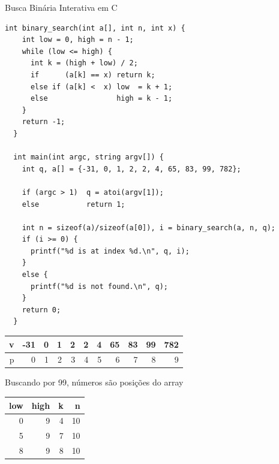\documentclass{beamer}
\begin{document}
\begin{frame}{Busca Binária Interativa em C}

  \begin{lstlisting}[style=tinyc,caption=src/numbers2.c]
  int binary_search(int a[], int n, int x) {
    int low = 0, high = n - 1;
    while (low <= high) {
      int k = (high + low) / 2;
      if      (a[k] == x) return k;
      else if (a[k] <  x) low  = k + 1;
      else                high = k - 1;
    }
    return -1;
  }

  int main(int argc, string argv[]) {
    int q, a[] = {-31, 0, 1, 2, 2, 4, 65, 83, 99, 782};
  
    if (argc > 1)  q = atoi(argv[1]);
    else           return 1;
    
    int n = sizeof(a)/sizeof(a[0]), i = binary_search(a, n, q);
    if (i >= 0) {
      printf("%d is at index %d.\n", q, i);
    }
    else {
      printf("%d is not found.\n", q);
    }
    return 0;
  }
  \end{lstlisting}

  \framebreak

  \begin{center}
    \begin{tabular}{|r|r|r|r|r|r|r|r|r|r|r|}
      \hline
      v & -31 & 0 & 1 & 2 & 2 & 4 & 65 & 83 & 99 & 782\\
      \hline
      p & 0 & 1 & 2 & 3 & 4 & 5 & 6 & 7 & 8 & 9\\
      \hline
    \end{tabular}
  \end{center}

  Buscando por 99, números são posições do array
  
  \begin{center}
    \begin{tabular}{rrrr}
      low & high & k & n\\ \hline
      0 & 9 & 4 & 10\\
      5 & 9 & 7 & 10\\
      8 & 9 & 8 & 10\\
    \end{tabular}
  \end{center}

\end{frame}
\end{document}
